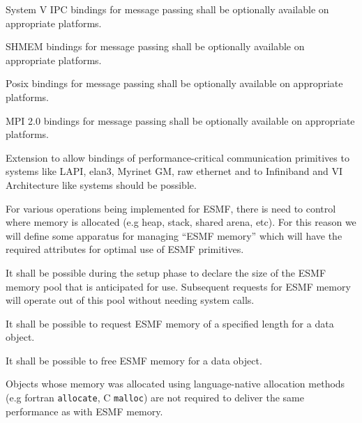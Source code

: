 
System V IPC bindings for message passing shall be optionally
available on appropriate platforms.


SHMEM bindings for message passing shall be optionally
available on appropriate platforms.


Posix bindings for message passing shall be optionally
available on appropriate platforms.


MPI 2.0 bindings for message passing shall be optionally
available on appropriate platforms.


Extension to allow bindings of performance-critical communication
primitives to systems like LAPI, elan3, Myrinet GM, raw ethernet and
to Infiniband and VI Architecture like systems should be possible.


For various operations being implemented for ESMF, there is need to
control where memory is allocated (e.g heap, stack, shared arena,
etc). For this reason we will define some apparatus for managing
``ESMF memory'' which will have the required attributes for optimal
use of ESMF primitives.


It shall be possible during the setup phase to declare the size of the
ESMF memory pool that is anticipated for use. Subsequent requests for
ESMF memory will operate out of this pool without needing system
calls.


It shall be possible to request ESMF memory of a specified length for
a data object.



It shall be possible to free ESMF memory for a data object.


Objects whose memory was allocated using language-native allocation
methods (e.g fortran \texttt{allocate}, C \texttt{malloc}) are not
required to deliver the same performance as with ESMF memory.


